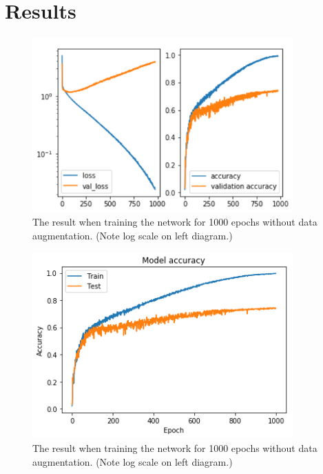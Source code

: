 \documentclass{kththesis}
\begin{document}
\chapter{Results}
\begin{figure}
  \begin{center}
    \includegraphics[width=100mm]{img/overfitted.png}
    \caption{The result when training the network for 1000 epochs without data augmentation. (Note log scale on left diagram.)}
    \label{fig:overfitted}
  \end{center}
\end{figure}
\begin{figure}
  \begin{center}
    \includegraphics[width=100mm]{img/overfitted_acc.png}
    \caption{The result when training the network for 1000 epochs without data augmentation. (Note log scale on left diagram.)}
    \label{fig:overfitted_acc}
  \end{center}
\end{figure}
\end{document}

